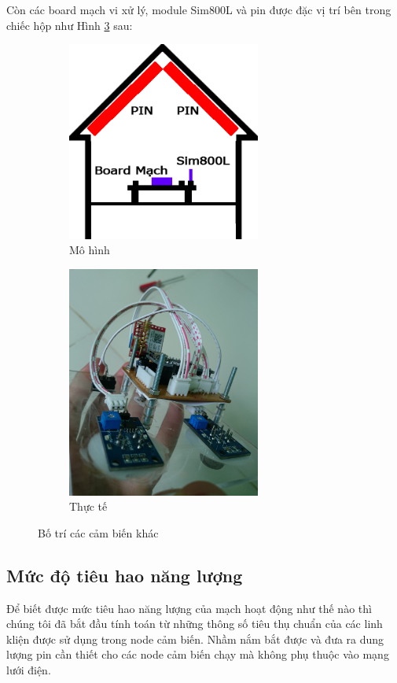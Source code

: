 Còn các board mạch vi xử lý, module Sim800L và pin được đặc vị trí bên trong chiếc hộp như Hình \ref{fig:botrikhac} sau:
\begin{figure}[H]
	\centering  
	\begin{subfigure}[b]{0.5\textwidth}
		\includegraphics[width=2.5in]{house_board_kogps}
		\caption[Mô hình]{Mô hình}
		\label{fig:house_board_kogps}
	\end{subfigure}\hfill
	\begin{subfigure}[b]{0.5\textwidth}
		\includegraphics[width=2.5in]{pic1}
		\caption[Thực tế]{Thực tế}
		\label{fig:pic1}
	\end{subfigure}
	\caption{Bố trí các cảm biến khác}\label{fig:botrikhac}
\end{figure}

















\subsection{Mức độ tiêu hao năng lượng}
Để biết được mức tiêu hao năng lượng của mạch hoạt động như thế nào thì chúng tôi đã bắt đầu tính toán từ những thông số tiêu thụ chuẩn của các linh kliện được sử dụng trong node cảm biến. Nhầm nắm bắt được và đưa ra dung lượng pin cần thiết cho các node cảm biến chạy mà không phụ thuộc vào mạng lưới điện.

